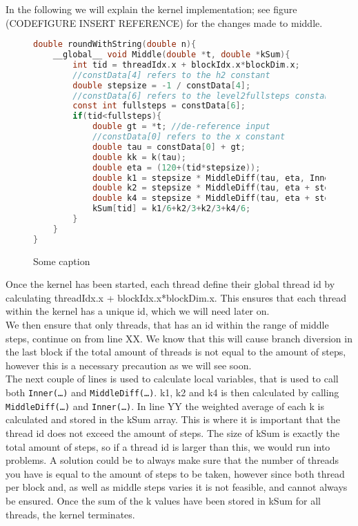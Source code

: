 In the following we will explain the kernel implementation; see figure (CODEFIGURE INSERT REFERENCE) for the changes made to middle. \\
\begin{figure}[H]
\begin{lstlisting}[language=c]
double roundWithString(double n){
	__global__ void Middle(double *t, double *kSum){
		int tid = threadIdx.x + blockIdx.x*blockDim.x;
		//constData[4] refers to the h2 constant
		double stepsize = -1 / constData[4]; 
		//constData[6] refers to the level2fullsteps constant
		const int fullsteps = constData[6]; 
		if(tid<fullsteps){
			double gt = *t; //de-reference input
			//constData[0] refers to the x constant
			double tau = constData[0] + gt; 
			double kk = k(tau);
			double eta = (120+(tid*stepsize));
			double k1 = stepsize * MiddleDiff(tau, eta, Inner(eta, gt, kk).y);
			double k2 = stepsize * MiddleDiff(tau, eta + stepsize/2, Inner(eta + stepsize/2, gt, kk).y);		
			double k4 = stepsize * MiddleDiff(tau, eta + stepsize, Inner(eta + stepsize, gt, kk).y);
			kSum[tid] = k1/6+k2/3+k2/3+k4/6;
		}
	}
}
\end{lstlisting}
\caption{Some caption}
\end{figure}


Once the kernel has been started, each thread define their global thread id by calculating threadIdx.x + blockIdx.x*blockDim.x. This ensures that each thread within the kernel has a unique id, which we will need later on.\\

We then ensure that only threads, that has an id within the range of middle steps, continue on from line XX. We know that this will cause branch diversion in the last block if the total amount of threads is not equal to the amount of steps, however this is a necessary precaution as we will see soon.\\

The next couple of lines is used to calculate local variables, that is used to call both \texttt{Inner(…)} and \texttt{MiddleDiff(…)}. k1, k2 and k4 is then calculated by calling \texttt{MiddleDiff(…)} and \texttt{Inner(…)}. In line YY the weighted average of each k is calculated and stored in the kSum array. This is where it is important that the thread id does not exceed the amount of steps. The size of kSum is exactly the total amount of steps, so if a thread id is larger than this, we would run into problems. A solution could be to always make sure that the number of threads you have is equal to the amount of steps to be taken, however since both thread per block and, as well as middle steps varies it is not feasible, and cannot always be ensured. Once the sum of the k values have been stored in kSum for all threads, the kernel terminates.


